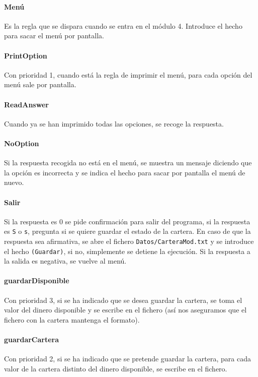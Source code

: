 \documentclass[11pt,leqno]{article}
\theoremstyle{definition_wo_parentheses}
\theoremstyle{plain}
\theoremstyle{remark}
\begin{document}
\paragraph{Menú} Es la regla que se dispara cuando se entra en el módulo 4. Introduce el hecho para sacar el menú por pantalla. 

\paragraph{PrintOption} Con prioridad 1, cuando está la regla de imprimir el menú, para cada opción del menú sale por pantalla.

\paragraph{ReadAnswer} Cuando ya se han imprimido todas las opciones, se recoge la respuesta. 

\paragraph{NoOption} Si la respuesta recogida no está en el menú, se muestra un mensaje diciendo que la opción es incorrecta y se indica el hecho para sacar por pantalla el menú de nuevo.

\paragraph{Salir} Si la respuesta es 0 se pide confirmación para salir del programa, si la respuesta es \texttt{S} o \texttt{s}, pregunta si se quiere guardar el estado de la cartera. En caso de que la respuesta sea afirmativa, se abre el fichero \texttt{Datos/CarteraMod.txt} y se introduce el hecho \texttt{(Guardar)}, si no, simplemente se detiene la ejecución. Si la respuesta a la salida es negativa, se vuelve al menú.

\paragraph{guardarDisponible} Con prioridad 3, si se ha indicado que se desea guardar la cartera, se toma el valor del dinero disponible y se escribe en el fichero (así nos aseguramos que el fichero con la cartera mantenga el formato).

\paragraph{guardarCartera} Con prioridad 2, si se ha indicado que se pretende guardar la cartera, para cada valor de la cartera distinto del dinero disponible, se escribe en el fichero.
\end{document}
